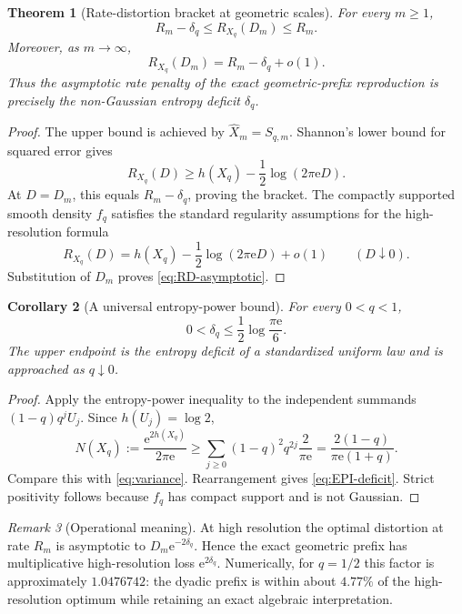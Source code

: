 \documentclass[11pt,oneside]{article}
\newtheorem{theorem}{Theorem}[section]
\newtheorem{corollary}[theorem]{Corollary}
\theoremstyle{definition}
\theoremstyle{remark}
\newtheorem{remark}[theorem]{Remark}
\newcommand{\e}{\mathrm e}
\begin{document}
\begin{theorem}[Rate-distortion bracket at geometric scales]
\label{thm:RD-bracket}
For every $m\ge1$,
\begin{equation}
 R_m-\delta_q\le R_{X_q}(D_m)\le R_m.
 \label{eq:RD-bracket}
\end{equation}
Moreover, as $m\to\infty$,
\begin{equation}
 R_{X_q}(D_m)=R_m-\delta_q+o(1).
 \label{eq:RD-asymptotic}
\end{equation}
Thus the asymptotic rate penalty of the exact geometric-prefix reproduction is
precisely the non-Gaussian entropy deficit $\delta_q$.
\end{theorem}

\begin{proof}
The upper bound is achieved by $\widehat X_m=S_{q,m}$.  Shannon's lower bound for
squared error gives
\[
 R_{X_q}(D)\ge h(X_q)-\frac12\log(2\pi\e D).
\]
At $D=D_m$, this equals $R_m-\delta_q$, proving the bracket.  The compactly
supported smooth density $f_q$ satisfies the standard regularity assumptions for
the high-resolution formula
\[
 R_{X_q}(D)=h(X_q)-\frac12\log(2\pi\e D)+o(1)
 \qquad(D\downarrow0).
\]
Substitution of $D_m$ proves \eqref{eq:RD-asymptotic}.
\end{proof}

\begin{corollary}[A universal entropy-power bound]
\label{cor:EPI-deficit}
For every $0<q<1$,
\begin{equation}
 0<\delta_q\le\frac12\log\frac{\pi\e}{6}.
 \label{eq:EPI-deficit}
\end{equation}
The upper endpoint is the entropy deficit of a standardized uniform law and is
approached as $q\downarrow0$.
\end{corollary}

\begin{proof}
Apply the entropy-power inequality to the independent summands
$(1-q)q^jU_j$.  Since $h(U_j)=\log2$,
\[
 N(X_q):=\frac{\e^{2h(X_q)}}{2\pi\e}
 \ge\sum_{j\ge0}(1-q)^2q^{2j}\frac{2}{\pi\e}
 =\frac{2(1-q)}{\pi\e(1+q)}.
\]
Compare this with \eqref{eq:variance}.  Rearrangement gives
\eqref{eq:EPI-deficit}.  Strict positivity follows because $f_q$ has compact
support and is not Gaussian.
\end{proof}

\begin{remark}[Operational meaning]
At high resolution the optimal distortion at rate $R_m$ is asymptotic to
$D_m\e^{-2\delta_q}$.  Hence the exact geometric prefix has multiplicative
high-resolution loss $\e^{2\delta_q}$.  Numerically, for $q=1/2$ this factor is
approximately $1.0476742$: the dyadic prefix is within about $4.77\%$ of the
high-resolution optimum while retaining an exact algebraic interpretation.
\end{remark}
\end{document}
